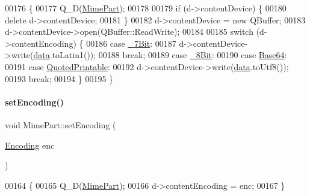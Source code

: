\begin{DoxyCode}
00176 \{
00177     Q\_D(\hyperlink{class_simple_mail_1_1_mime_part}{MimePart});
00178 
00179     \textcolor{keywordflow}{if} (d->contentDevice) \{
00180         \textcolor{keyword}{delete} d->contentDevice;
00181     \}
00182     d->contentDevice = \textcolor{keyword}{new} QBuffer;
00183     d->contentDevice->open(QBuffer::ReadWrite);
00184 
00185     \textcolor{keywordflow}{switch} (d->contentEncoding) \{
00186     \textcolor{keywordflow}{case} \hyperlink{class_simple_mail_1_1_mime_part_ae67a2f5406958b95b18bf31a7bbeb5c9a93d518d86036ce6f149ffa646b52235a}{\_7Bit}:
00187         d->contentDevice->write(\hyperlink{class_simple_mail_1_1_mime_part_ab6260fc481df5162673f1ac93ec92dac}{data}.toLatin1());
00188         \textcolor{keywordflow}{break};
00189     \textcolor{keywordflow}{case} \hyperlink{class_simple_mail_1_1_mime_part_ae67a2f5406958b95b18bf31a7bbeb5c9a27c1574a6fe2fa936ae6cfe9654bb37f}{\_8Bit}:
00190     \textcolor{keywordflow}{case} \hyperlink{class_simple_mail_1_1_mime_part_ae67a2f5406958b95b18bf31a7bbeb5c9ae644dc14ba856889814d2da9c995b91a}{Base64}:
00191     \textcolor{keywordflow}{case} \hyperlink{class_simple_mail_1_1_mime_part_ae67a2f5406958b95b18bf31a7bbeb5c9a29b5533d69a04cfef2c3ff6538c44db0}{QuotedPrintable}:
00192         d->contentDevice->write(\hyperlink{class_simple_mail_1_1_mime_part_ab6260fc481df5162673f1ac93ec92dac}{data}.toUtf8());
00193         \textcolor{keywordflow}{break};
00194     \}
00195 \}
\end{DoxyCode}
\mbox{\label{class_simple_mail_1_1_mime_part_a006db8e82f557f4fe92313e9f2a4c87d}} 
\paragraph{\texorpdfstring{set\+Encoding()}{setEncoding()}}
{\footnotesize\ttfamily void Mime\+Part\+::set\+Encoding (\begin{DoxyParamCaption}\item[{\hyperlink{class_simple_mail_1_1_mime_part_ae67a2f5406958b95b18bf31a7bbeb5c9}{Encoding}}]{enc }\end{DoxyParamCaption})}


\begin{DoxyCode}
00164 \{
00165     Q\_D(\hyperlink{class_simple_mail_1_1_mime_part}{MimePart});
00166     d->contentEncoding = enc;
00167 \}
\end{DoxyCode}
\mbox{\label{class_simple_mail_1_1_mime_part_ad008e68412ccd0cd4b5b69b29ce77efb}} 
